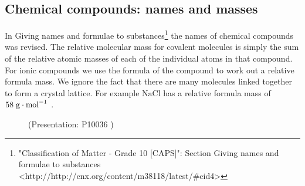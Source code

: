             \subsection{ Chemical compounds: names and masses}
            \nopagebreak
\label{m38689*uid97124}In Giving names and formulae to substances\footnote{\raggedright{}"Classification of Matter - Grade 10 [CAPS]": Section Giving names and formulae to substances <http://http://cnx.org/content/m38118/latest/\#cid4>} the names of chemical compounds was revised. The relative molecular mass for covalent molecules is simply the sum of the relative atomic masses of each of the individual atoms in that compound. For ionic compounds we use the formula of the compound to work out a relative formula mass. We ignore the fact that there are many molecules linked together to form a crystal lattice. For example $\mathrm{NaCl}$ has a relative formula mass of $58\phantom{\rule{3pt}{0ex}}\mathrm{g}\ensuremath{\cdot}{\mathrm{mol}}^{-1}$ .  
    \label{m38689*eip-891}
    \setcounter{subfigure}{0}
	\begin{figure}[H] %
    \label{m38689*slidesharemedia}\label{m38689*slideshareflash} { (Presentation:  P10036 )}
      \vspace{2pt}
    \vspace{.1in}
 \end{figure}       \par \label{m38689*cid13}
